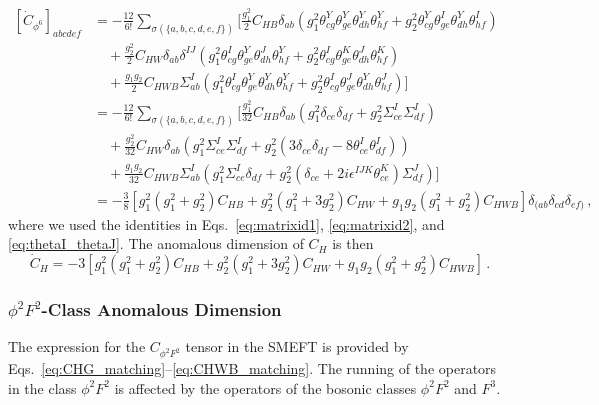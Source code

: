 \begin{align}
    \left[\dot C_{\phi^6}\right]_{abcdef} &=
    - \frac{12}{6!}\sum_{\sigma(\{a,b,c,d,e,f\})}
    \bigg[
    \frac{g_1^2}{2}C_{HB}\delta_{ab}(g_1^2 \theta^Y_{cg}\theta^Y_{ge}\theta^Y_{dh}\theta^Y_{hf}
    +
    g_2^2 \theta^Y_{cg}\theta^I_{ge}\theta^Y_{dh}\theta^I_{hf}) \\
    &\quad + 
    \frac{g_2^2}{2}C_{HW}\delta_{ab}\delta^{IJ}
    (g_1^2 \theta^I_{cg}\theta^Y_{ge}\theta^J_{dh}\theta^Y_{hf}
    +g_2^2 
    \theta^I_{cg}\theta^K_{ge}\theta^J_{dh}\theta^K_{hf}
    )\nonumber \\
    &\quad + \frac{g_1 g_2}{2}C_{HWB}\Sigma^I_{ab}(g_1^2 
    \theta^I_{cg}\theta^Y_{ge}\theta^Y_{dh}\theta^Y_{hf}
    + g_2^2
    \theta^I_{cg}\theta^J_{ge}\theta^Y_{dh}\theta^J_{hf}
    )
    \bigg] \nonumber \\
    &= 
    - \frac{12}{6!}\sum_{\sigma(\{a,b,c,d,e,f\})}
    \bigg[
    \frac{g_1^2}{32}C_{HB}\delta_{ab}(g_1^2 \delta_{ce}\delta_{df}+g_2^2 \Sigma^I_{ce}\Sigma^I_{df})\nonumber \\
    &\quad + \frac{g_2^2}{32}
    C_{HW}\delta_{ab}
    (g_1^2 \Sigma^I_{ce}\Sigma^I_{df}
    +g_2^2 (3\delta_{ce}\delta_{df}
    -8 \theta^I_{ce}\theta^I_{df}
    )
    )\nonumber \\
    &\quad +
    \frac{g_1 g_2}{32}C_{HWB}\Sigma^I_{ab}
    (
    g_1^2 \Sigma^I_{ce}\delta_{df}
    +
    g_2^2  (
    \delta_{ce}
    +
    2i \epsilon^{IJK}\theta^K_{ce}
    )\Sigma^J_{df}
    )
    \bigg]\nonumber \\
    &=-\frac{3}{8}\left[g_1^2(g_1^2+g_2^2)C_{HB} + g_2^2(g_1^2+3g_2^2)C_{HW} + g_1g_2 (g_1^2+g_2^2) C_{HWB}\right]\delta_{(ab}\delta_{cd}\delta_{ef)}\,,\nonumber
\end{align}
where we used the identities in Eqs.~\eqref{eq:matrixid1}, \eqref{eq:matrixid2}, and \eqref{eq:thetaI_thetaJ}.
The anomalous dimension of $C_H$ is then
\begin{equation}
    \dot C_H = -3 \left[g_1^2(g_1^2+g_2^2)C_{HB} + g_2^2(g_1^2+3g_2^2)C_{HW} + g_1g_2 (g_1^2+g_2^2) C_{HWB}\right]\,.
\end{equation}

\subsubsection{\texorpdfstring{$\phi^2 F^2$}{phi2F2}-Class Anomalous Dimension}

The expression for the $C_{\phi^2 F^2}$ tensor in the SMEFT is provided by Eqs.~\eqref{eq:CHG_matching}--\eqref{eq:CHWB_matching}.
The running of the operators in the class $\phi^2 F^2$ is affected by the operators of the bosonic classes $\phi^2 F^2$ and $F^3$.

